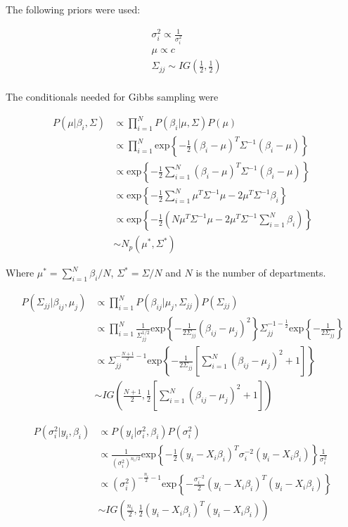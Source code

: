 \documentclass[paper=a4, fontsize=11pt]{scrartcl}
\begin{document}
The following priors were used:

\begin{align*}
    & \sigma^2_i \propto \frac{1}{\sigma^2_i}\\
    & \mu \propto c \\
    & \Sigma_{jj} \sim IG \left(\frac{1}{2}, \frac{1}{2} \right)\\
\end{align*}


The conditionals needed for Gibbs sampling were

\begin{align*}
     P(\mu | \beta_i, \Sigma ) &\propto  \prod_{i=1}^{N} P(\beta_i | \mu, \Sigma)P(\mu) \\
     & \propto \prod_{i=1}^{N} \mbox{exp}\left \{-\frac{1}{2}(\beta_i - \mu)^T\Sigma^{-1}(\beta_i - \mu) \right \} \\
     & \propto \mbox{exp}\left \{-\frac{1}{2} \sum_{i=1}^{N} (\beta_i - \mu)^T\Sigma^{-1}(\beta_i - \mu) \right \}\\
     & \propto \mbox{exp}\left \{-\frac{1}{2} \sum_{i=1}^{N} \mu^T \Sigma^{-1}  \mu - 2\mu^T\Sigma^{-1} \beta_i \right \}\\
     & \propto \mbox{exp}\left \{-\frac{1}{2}\left(N \mu^T \Sigma^{-1}  \mu - 2\mu^T\Sigma^{-1} \sum_{i=1}^{N}\beta_i\right) \right \}\\
     &\sim N_p (\mu^*, \Sigma^*)
\end{align*}


Where $\mu^* = \sum_{i=1}^{N}\beta_i/N $, $\Sigma^* = \Sigma/N$ and $N$ is the number of departments.


\begin{align*}
     P(\Sigma_{jj} |\beta_{ij}, \mu_j ) & \propto  \prod_{i=1}^{N} P(\beta_{ij} | \mu_{j}, \Sigma_{jj})P(\Sigma_{jj}) \\
     & \propto \prod_{i=1}^{N} \frac{1}{\Sigma_{jj}^{1/2}} \mbox{exp} \left \{ -\frac{1}{2\Sigma_{jj} }(\beta_{ij} - \mu_j)^2 \right \} \Sigma_{jj}^{-1-\frac{1}{2}}\mbox{exp}\left \{-\frac{1}{2\Sigma_{jj}} \right \} \\
     & \propto  \Sigma_{jj}^{-\frac{N+1}{2}-1} \mbox{exp} \left \{  -\frac{1}{2\Sigma_{jj}  }\left[\sum_{i=1}^{N}(\beta_{ij} - \mu_j)^2 + 1 \right] \right \}\\
     & \sim IG \left(\frac{N+1}{2}, \frac{1}{2} \left[\sum_{i=1}^{N}(\beta_{ij} - \mu_j)^2 + 1 \right] \right)
\end{align*}


\begin{align*}
     P(\sigma^2_i |y_i, \beta_i ) & \propto P(y_i| \sigma^2_i, \beta_i)P(\sigma^2_i)\\
     & \propto \frac{1}{(\sigma^2_i)^{n_i/2}} \mbox{exp}\left \{ -\frac{1}{2}(y_i-X_i\beta_i)^T \sigma^{-2}_i(y_i-X_i\beta_i)      \right \} \frac{1}{\sigma^2_i}\\
      & \propto (\sigma^2_i)^{-\frac{n_i}{2}-1} \mbox{exp}\left \{ -\frac{\sigma^{-2}_i}{2}(y_i-X_i\beta_i)^T (y_i-X_i\beta_i)\right \} \\
      &  \sim IG\left(\frac{n_i}{2}, \frac{1}{2}(y_i-X_i\beta_i)^T (y_i-X_i\beta_i)\right)
\end{align*}
\end{document}
